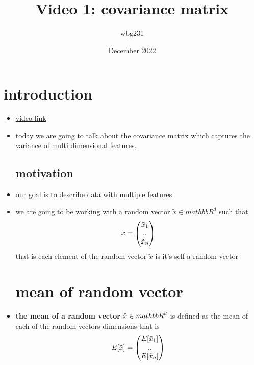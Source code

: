\documentclass{article}
\title{Video 1: covariance matrix}
\author{wbg231 }
\date{December 2022}
\begin{document}
\maketitle

\section{introduction}
\begin{itemize}
\item \href{https://www.youtube.com/watch?v=olyVNcJknNg&ab_channel=CarlosFernandez-Granda}{video link}
\item today we are going to talk about the covariance matrix which captures the variance of multi dimensional features. 
\subsection*{motivation}
\item our goal is to describe data with multiple features 
\item we are going to be working with a random vector $\tilde{x}\in mathbb{R}^{d}$ such that $$\tilde{x}=\begin{pmatrix}
    \Tilde{x}_1\\..\\\Tilde{x}_n
\end{pmatrix}$$
that is each element of the random vector $\tilde{x}$ is it's self a random vector
\section*{mean of random vector}
\item \textbf{the mean of a random vector} $\Tilde{x}\in mathbb{R}^{d}$ is defined as the mean of each of the random vectors
 dimensions that is$$E[\tilde{x}]=\begin{pmatrix}
    E[\Tilde{x}_1]\\..\\E[\Tilde{x}_n]
\end{pmatrix}$$

\end{itemize}
\end{document}
